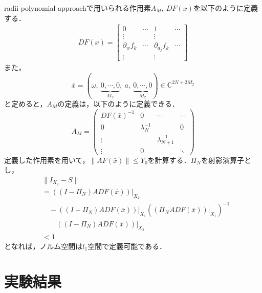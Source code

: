 \documentclass[a4paper,10pt,twocolumn]{jsarticle}
\newcommand{\rad}{radii polynomial approach}
\begin{document}
\rad{}で用いられる作用素$A_M,\ DF(x)$を以下のように定義する．
\begin{equation}
  \begin{split}
    DF(x) = \left[
      \begin{array}{c|ccc}
        0 & \cdots & 1 & \cdots \\ \hline
        \vdots & & \vdots &  \\
        \partial_w f_k & \cdots & \partial_{a_j}f_k & \cdots \\
        \vdots & & \vdots &
      \end{array}
    \right] %
  \end{split}
\end{equation}
また，
\begin{equation}
  \bar{x} = (\omega,\ \underbrace{0,\cdots,0}_{M_2},\ a,\ \underbrace{0,\cdots,0}_{M_2}) \in \mathbb{C}^{2N+2M_2}
\end{equation}
と定めると，$A_M$の定義は，以下のように定義できる．
\begin{equation}
  A_M = \left(
  \begin{array}{c|ccc}
    DF(\bar{x})^{-1} & 0 & \cdots & \cdots \\ \hline
    0 & \lambda_N^{-1} &  & 0 \\
    \vdots &  & \lambda_{N+1}^{-1} &  \\
    \vdots & 0 &   & \ddots
  \end{array}
  \right)
\end{equation}
定義した作用素を用いて，$\| AF(\bar{x}) \| \leq Y_0$を計算する．$\Pi_N$を射影演算子とし，
\begin{equation}
  \begin{split}
    &\| I_{X_2} - S\|\\
    &= \left( \left( I-\Pi_N \right) ADF ( \bar{x} ) \right)|_{X_2}  \\
    &\quad -(\left( I-\Pi_N \right) ADF( \bar{x} ))|_{X_1} \left((\Pi_N ADF(\bar{x}))|_{X_1}\right)^{-1}\\
    &\qquad ((I-\Pi_N)ADF(\bar{x}))|_{X_2} \\
    & < 1
  \end{split}
\end{equation}
となれば，ノルム空間は$l_1$空間で定義可能である．

\vspace{-1mm}
\section{実験結果}
\vspace{-1mm}
\end{document}
